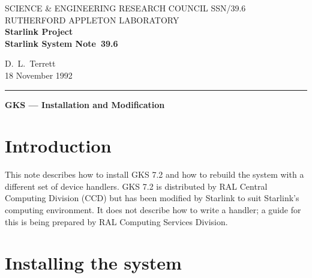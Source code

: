 \pagestyle{myheadings}

\newcommand{\stardoccategory}  {Starlink System Note}
\newcommand{\stardocinitials}  {SSN}
\newcommand{\stardocnumber}    {39.6}
\newcommand{\stardocauthors}   {D.\ L.\ Terrett}
\newcommand{\stardocdate}      {18 November 1992}
\newcommand{\stardoctitle}     {GKS --- Installation and Modification}

\newcommand{\stardocname}{\stardocinitials /\stardocnumber}
\renewcommand{\_}{{\tt\char'137}}     %
\markright{\stardocname}
\setlength{\textwidth}{160mm}
\setlength{\textheight}{230mm}
\setlength{\topmargin}{-2mm}
\setlength{\oddsidemargin}{0mm}
\setlength{\evensidemargin}{0mm}
\setlength{\parindent}{0mm}
\setlength{\parskip}{\medskipamount}
\setlength{\unitlength}{1mm}


\thispagestyle{empty}
SCIENCE \& ENGINEERING RESEARCH COUNCIL \hfill \stardocname\\
RUTHERFORD APPLETON LABORATORY\\
{\large\bf Starlink Project\\}
{\large\bf \stardoccategory\ \stardocnumber}
\begin{flushright}
\stardocauthors\\
\stardocdate
\end{flushright}
\vspace{-4mm}
\rule{\textwidth}{0.5mm}
\vspace{5mm}
\begin{center}
{\Large\bf \stardoctitle}
\end{center}
\vspace{5mm}

\section{Introduction}

This note describes how to install GKS 7.2 and how to rebuild the system with a
different set of device handlers.
GKS 7.2 is distributed by RAL Central Computing Division (CCD) but has been
modified by Starlink to suit Starlink's computing environment.
It does not describe how to write a handler; a guide for this is being prepared
by RAL Computing Services Division.

\section{Installing the system}

